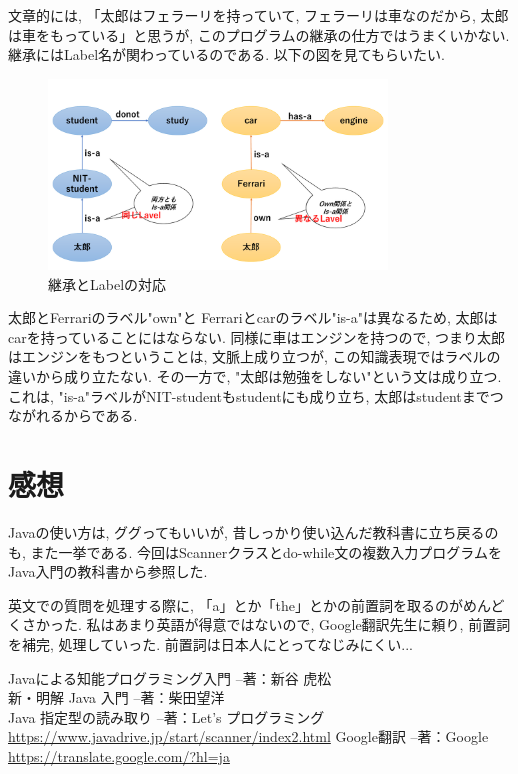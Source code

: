 \documentclass[uplatex,12pt]{jsarticle}
\begin{document}
文章的には, 「太郎はフェラーリを持っていて, フェラーリは車なのだから, 太郎は車をもっている」と思うが, このプログラムの継承の仕方ではうまくいかない. 継承にはLabel名が関わっているのである. 以下の図を見てもらいたい.
\begin{figure}[htbp]
 \begin{center}
  \includegraphics[width = 9cm, pagebox = cropbox, clip]{継承とLabelの対応.pdf}
 \end{center}
 \caption[]{継承とLabelの対応}\label{fig:fig1.1}
\end{figure}

太郎とFerrariのラベル"own"と Ferrariとcarのラベル"is-a"は異なるため, 太郎はcarを持っていることにはならない. 同様に車はエンジンを持つので, つまり太郎はエンジンをもつということは, 文脈上成り立つが, この知識表現ではラベルの違いから成り立たない. その一方で, "太郎は勉強をしない"という文は成り立つ. これは, "is-a"ラベルがNIT-studentもstudentにも成り立ち, 太郎はstudentまでつながれるからである.


\section{感想}
Javaの使い方は, ググってもいいが, 昔しっかり使い込んだ教科書に立ち戻るのも, また一挙である. 今回はScannerクラスとdo-while文の複数入力プログラムをJava入門の教科書から参照した.

英文での質問を処理する際に, 「a」とか「the」とかの前置詞を取るのがめんどくさかった. 私はあまり英語が得意ではないので, Google翻訳先生に頼り, 前置詞を補完, 処理していった. 前置詞は日本人にとってなじみにくい...

\begin{thebibliography}{99}
 Javaによる知能プログラミング入門 --著：新谷 虎松 \\
 新・明解 Java 入門 --著：柴田望洋 \\
 Java 指定型の読み取り --著：Let's プログラミング \\
\url{https://www.javadrive.jp/start/scanner/index2.html}
 Google翻訳 --著：Google \\
\url{https://translate.google.com/?hl=ja}
\end{thebibliography}
\end{document}
